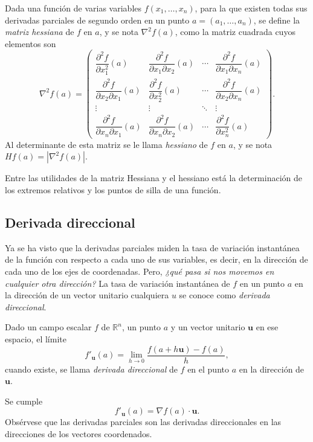 \begin{definicion}
Dada una función de varias variables $f(x_1,\ldots,x_n)$, para la que existen todas sus derivadas parciales de segundo
orden en un punto $a=(a_1,\ldots,a_n)$, se define la \emph{matriz hessiana} de $f$ en $a$, y se nota $\nabla^2f(a)$, como la
matriz cuadrada cuyos elementos son
\[
\nabla^2f(a)=\left(
\begin{array}{cccc}
\dfrac{\partial^2 f}{\partial x_1^2}(a) & 
\dfrac{\partial^2 f}{\partial x_1 \partial x_2}(a) &
\cdots &
\dfrac{\partial^2 f}{\partial x_1 \partial x_n}(a)\\
\dfrac{\partial^2 f}{\partial x_2 \partial x_1}(a) &
\dfrac{\partial^2 f}{\partial x_2^2}(a) & 
\cdots &
\dfrac{\partial^2 f}{\partial x_2 \partial x_n}(a)\\
\vdots & \vdots & \ddots & \vdots \\
\dfrac{\partial^2 f}{\partial x_n \partial x_1}(a) &
\dfrac{\partial^2 f}{\partial x_n \partial x_2}(a) &
\cdots &
\dfrac{\partial^2 f}{\partial x_n^2}(a)
\end{array}
\right).
\]
Al determinante de esta matriz se le llama \emph{hessiano} de $f$ en $a$, y se nota $Hf(a)=|\nabla^2f(a)|$.
\end{definicion}

Entre las utilidades de la matriz Hessiana y el hessiano está la determinación de los extremos relativos y los puntos de
silla de una función. 

\subsection{Derivada direccional}
Ya se ha visto que la derivadas parciales miden la tasa de variación instantánea de la función con respecto a cada uno
de sus variables, es decir, en la dirección de cada uno de los ejes de coordenadas. 
Pero, \emph {¿qué pasa si nos movemos en cualquier otra dirección?}
La tasa de variación instantánea de $f$ en un punto $a$ en la dirección de un vector unitario cualquiera $u$ se conoce
como \emph{derivada direccional}.

\begin{definicion}
Dado un campo escalar $f$ de $\mathbb{R}^n$, un punto $a$ y un vector unitario $\mathbf{u}$ en ese espacio, el límite
\[
f'_{\mathbf{u}}(a) = \lim_{h\rightarrow 0}\frac{f(a+h\mathbf{u})-f(a)}{h},
\] 
cuando existe, se llama \emph{derivada direccional} de $f$ en el punto $a$ en la dirección de $\mathbf{u}$.
\end{definicion}
Se cumple 
\[
f'_{\mathbf{u}}(a) =\nabla f(a)\cdot \mathbf{u}.
\]
Obsérvese que las derivadas parciales son las derivadas direccionales en las direcciones de los vectores coordenados.

